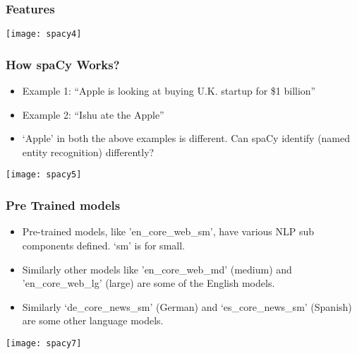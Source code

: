 \begin{frame}[fragile]\frametitle{Features}
\begin{center}
\texttt{[image: spacy4]}
\end{center}

\end{frame}



\begin{frame}[fragile]\frametitle{How spaCy Works?}
  \begin{itemize}
    \item Example 1: ``Apple is looking at buying U.K. startup for \$1 billion''
		\item Example 2: ``Ishu ate the Apple''
		\item `Apple' in both the above examples is different. Can spaCy identify (named entity recognition) differently?
  \end{itemize}
	
\begin{center}
\texttt{[image: spacy5]}
\end{center}
	
\end{frame}

\begin{frame}[fragile]\frametitle{Pre Trained models}
\begin{itemize}
\item Pre-trained models, like 'en\_core\_web\_sm', have various NLP sub components defined. `sm' is for small.
\item Similarly other models like  'en\_core\_web\_md' (medium) and 'en\_core\_web\_lg' (large) are some of the English models.
\item Similarly `de\_core\_news\_sm' (German) and  `es\_core\_news\_sm' (Spanish) are some other language models.
\end{itemize}

\begin{center}
\texttt{[image: spacy7]}
\end{center}

\end{frame}


